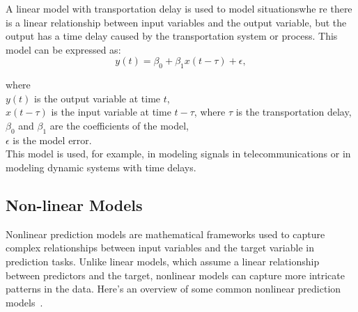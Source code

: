 \documentclass[12pt]{article}
\begin{document}
A linear model with transportation delay is used to model situationswhe
re there is a linear relationship between input variables and the
output variable, but the output has a time delay caused by the
transportation system or process. This model can be expressed as:\\

\begin{equation}
    y(t) = \beta_0 + \beta_1 x(t - \tau) + \epsilon,
\end{equation}

\noindent where\\
\( y(t) \) is the output variable at time \( t \),\\
\( x(t - \tau) \) is the input variable at time \( t - \tau \), where \( \tau \) is the transportation delay,\\
\( \beta_0 \) and \( \beta_1 \) are the coefficients of the model,\\
\( \epsilon \) is the model error.\\

\noindent This model is used, for example, in modeling signals in telecommunications
or in modeling dynamic systems with time delays.

\subsection{Non-linear Models}

Nonlinear prediction models are mathematical frameworks used to capture complex relationships
between input variables and the target variable in prediction tasks. Unlike linear models,
which assume a linear relationship between predictors and the target, nonlinear models can
capture more intricate patterns in the data. Here's an overview of some common nonlinear
prediction models~\cite{WOS:000980444400020}.\\
\\
\end{document}
